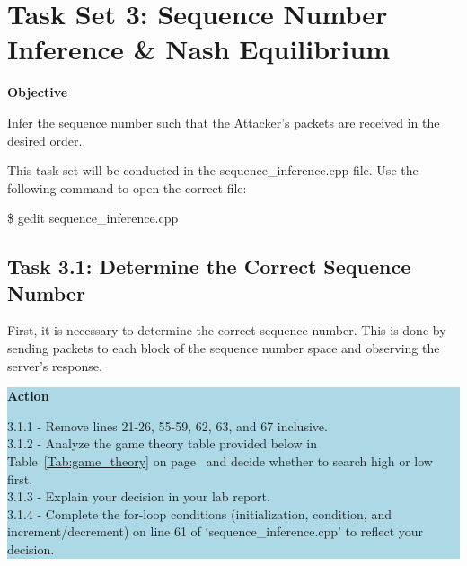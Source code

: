 \documentclass[letterpaper,12pt]{report}
\begin{document}
\begin{sloppypar}
\section*{Task Set 3: Sequence Number Inference \& Nash Equilibrium}\label{sec:Task-Set-3}

\textbf{Objective}

Infer the sequence number such that the Attacker's packets are received in the desired order.

\bigskip

This task set will be conducted in the sequence\_inference.cpp file. Use the following command to open the correct file:

\bigskip

\begin{mdframed}[backgroundcolor=black!10,style=code,nobreak=true,align=center,userdefinedwidth=14cm]
\$ gedit sequence\_inference.cpp
\end{mdframed}

\bigskip

\subsection*{Task 3.1: Determine the Correct Sequence Number}\label{sec:Task-3.1-Determine-the-Correct-Sequence-Number}

First, it is necessary to determine the correct sequence number. This is done by sending packets to each block of the sequence number space and observing the server's response.

\colorbox{lightblue}{%
\parbox{\dimexpr\linewidth-2\fboxsep}{%
\textbf{Action}

3.1.1 - Remove lines 21-26, 55-59, 62, 63, and 67 inclusive.\\
3.1.2 - Analyze the game theory table provided below in Table~\ref{Tab:game_theory} on page~\pageref{Tab:game_theory} and decide whether to search high or low first.\\
3.1.3 - Explain your decision in your lab report.\\
3.1.4 - Complete the for-loop conditions (initialization, condition, and increment/decrement) on line 61 of `sequence\_inference.cpp' to reflect your decision.\\
    }%
}%


\end{sloppypar}
\end{document}
